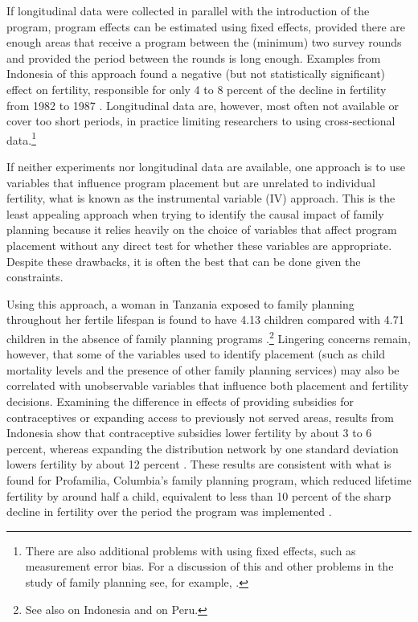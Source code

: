 \documentclass[]{article}
\begin{document}
If longitudinal data were collected in parallel with the introduction of the program, program effects can be estimated using fixed effects, provided there are enough areas that receive a program between the (minimum) two survey rounds and provided the period between the rounds is long enough. Examples from Indonesia of this approach found a negative (but not statistically significant) effect on fertility, responsible for only 4 to 8 percent of the decline in fertility from 1982 to 1987 \citep{pitt93,Gertler1994}. Longitudinal data are, however, most often not available or cover too short periods, in practice limiting researchers to using cross-sectional data.\footnote{There are also additional problems with using fixed effects, such as measurement error bias. For a discussion of this and other problems in the study of family planning see, for example, \cite{angeles98}.}

If neither experiments nor longitudinal data are available, one approach is to use variables that influence program placement but are unrelated to individual fertility, what is known as the instrumental variable (IV) approach. This is the least appealing approach when trying to identify the causal impact of family planning because it relies heavily on the choice of variables that affect program placement without any direct test for whether these variables are appropriate. Despite these drawbacks, it is often the best that can be done given the constraints.

Using this approach, a woman in Tanzania exposed to family planning throughout her fertile lifespan is found to have 4.13 children compared with 4.71 children in the absence of family planning programs \citep{angeles98}.\footnote{See also \citet{Angeles2005} on Indonesia and \citep{Angeles2005a} on Peru.} Lingering concerns remain, however, that some of the variables used to identify placement (such as child mortality levels and the presence of other family planning services) may also be correlated with unobservable variables that influence both placement and fertility decisions. Examining the difference in effects of providing subsidies for contraceptives or expanding access to previously not served areas, results from Indonesia show that contraceptive subsidies lower fertility by about 3 to 6 percent, whereas expanding the distribution network by one standard deviation lowers fertility by about 12 percent \citep{Molyneaux2000}. These results are consistent with what is found for Profamilia, Columbia's family planning program, which reduced lifetime fertility by around half a child, equivalent to less than 10 percent of the sharp decline in fertility over the period the program was implemented \citep{Miller2010}.
\end{document}
